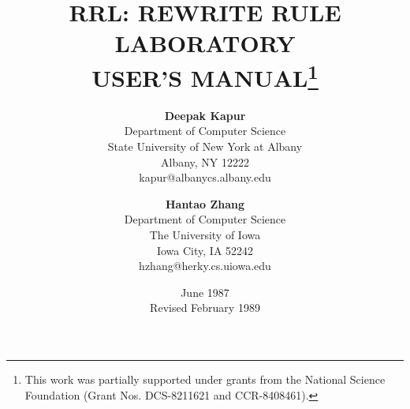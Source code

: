 \title{\bf RRL:  REWRITE  RULE  LABORATORY
 \\[0.5in] 
USER'S  MANUAL\thanks{This work was partially supported under grants from the
National Science Foundation (Grant Nos. DCS-8211621 and CCR-8408461).
}}
\author{{\bf Deepak Kapur} \\
Department of Computer Science \\
State University of New York at Albany \\
Albany, NY 12222 \\
kapur@albanycs.albany.edu \\
\and
{\bf Hantao Zhang} \\
Department of Computer Science \\
The University of Iowa \\
Iowa City, IA 52242 \\
hzhang@herky.cs.uiowa.edu}

\date{June 1987 \\ Revised February 1989}
\maketitle


